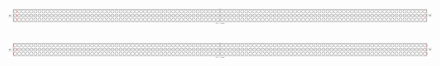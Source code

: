 \documentclass[first,firstsupp,lastsupp,last,hyperref,table]{ETHclass}
\begin{document}
\begin{frame}
\begin{columns}[c]
\begin{column}{0.5\textwidth}
\begin{figure}
\end{figure}
\end{column}
\end{columns}
\centering
\begin{figure}
\centering
\includegraphics[width=1.05\textwidth]{twofibers-sameside-strainmagni101.pdf}
\end{figure}
\vspace{-0.35cm}
\begin{figure}
\centering
\includegraphics[width=1.05\textwidth]{twofibers-oppositeside-strainmagni101.pdf}
\end{figure}
\end{frame}

\addtocounter{framenumber}{-1}
\end{document}
